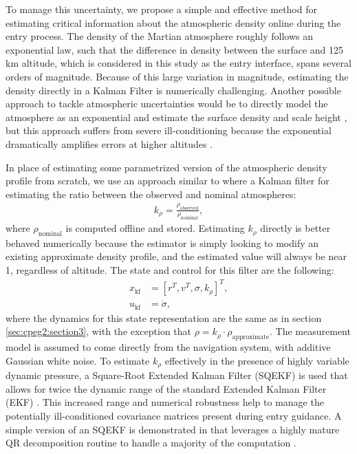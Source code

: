 To manage this uncertainty, we propose a simple and effective method for estimating critical information about the atmospheric density online during the entry process. The density of the Martian atmosphere roughly follows an exponential law, such that the difference in density between the surface and 125 km altitude, which is considered in this study as the entry interface, spans several orders of magnitude. Because of this large variation in magnitude, estimating the density directly in a Kalman Filter is numerically challenging. Another possible approach to tackle atmospheric uncertainties would be to directly model the atmosphere as an exponential and estimate the surface density and scale height \cite{markley2014}, but this approach suffers from severe ill-conditioning because the exponential dramatically amplifies errors at higher altitudes \cite{heidrich2021,dutta2014}. 

In place of estimating some parametrized version of the atmospheric density profile from scratch, we use an approach similar to \cite{roelke2009} where a Kalman filter for estimating the ratio between the observed and nominal atmospheres:
\begin{align}
    k_\rho = \frac{\rho_\text{observed}}{\rho_\text{nominal}},
\end{align}
where $\rho_\text{nominal}$ is computed offline and stored. Estimating $k_\rho$ directly is better behaved numerically because the estimator is simply looking to modify an existing approximate density profile, and the estimated value will always be near 1, regardless of altitude. The state and control for this filter are the following:
\begin{align}
    x_\text{kf} &= [r^T, v^T, \sigma, k_\rho]^T, \\ 
    u_\text{kf} &= \dot{\sigma},
\end{align}
where the dynamics for this state representation are the same as in section \ref{sec:cpeg2:section3}, with the exception that $\rho = k_\rho \cdot \rho_\text{approximate}$. The measurement model is assumed to come directly from the navigation system, with additive Gaussian white noise. To estimate $k_\rho$ effectively in the presence of highly variable dynamic pressure, a Square-Root Extended Kalman Filter (SQEKF) is used that allows for twice the dynamic range of the standard Extended Kalman Filter (EKF) \cite{kaminski1971}. This increased range and numerical robustness help to manage the potentially ill-conditioned covariance matrices present during entry guidance. A simple version of an SQEKF is demonstrated in \cite{tracy2022f} that leverages a highly mature QR decomposition routine to handle a majority of the computation \cite{strang1968}.

